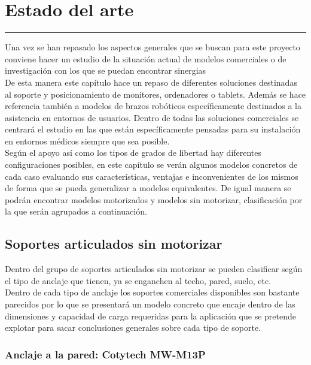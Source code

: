 \chapter{Estado del arte} \label{chap:estadoarte}
\hrule
\vspace{3mm}

Una vez se han repasado los aspectos generales que se buscan para este proyecto conviene hacer un estudio de la situación actual de modelos comerciales o de investigación con los que se puedan encontrar sinergias 
\\

De esta manera este capítulo hace un repaso de diferentes soluciones destinadas al soporte y posicionamiento de monitores, ordenadores o tablets. Además se hace referencia también a modelos de brazos robóticos específicamente destinados a la asistencia en entornos de usuarios. Dentro de todas las soluciones comerciales se centrará el estudio en las que están específicamente pensadas para su instalación en entornos médicos siempre que sea posible.
\\

Según el apoyo así como los tipos de grados de libertad hay diferentes configuraciones posibles, en este capítulo se verán algunos modelos concretos de cada caso evaluando sus características, ventajas e inconvenientes de los mismos de forma que se pueda generalizar a modelos equivalentes. De igual manera se podrán encontrar modelos motorizados y modelos sin motorizar, clasificación por la que serán agrupados a continuación.
\\

\section{Soportes articulados sin motorizar}

Dentro del grupo de soportes articulados sin motorizar se pueden clasificar según el tipo de anclaje que tienen, ya se enganchen al techo, pared, suelo, etc.
\\

Dentro de cada tipo de anclaje los soportes comerciales disponibles son bastante parecidos por lo que se presentará un modelo concreto que encaje dentro de las dimensiones y capacidad de carga requeridas para la aplicación que se pretende explotar para sacar conclusiones generales sobre cada tipo de soporte.

\subsection{Anclaje a la pared: Cotytech MW-M13P}


